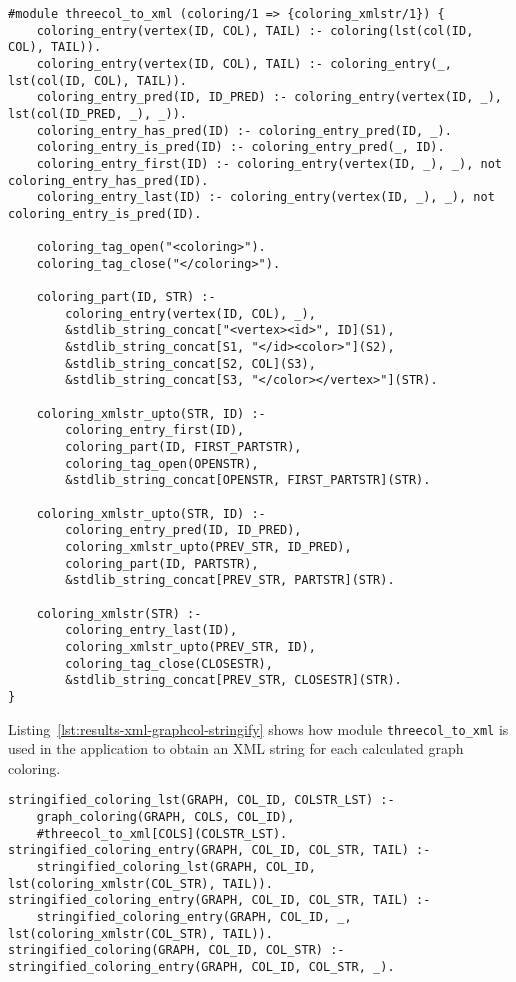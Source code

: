 \begin{lstlisting}[style=asp-code, label={lst:results-xml-graphcol-serialization}, caption={Generating XML strings for graph colorings.}]
#module threecol_to_xml (coloring/1 => {coloring_xmlstr/1}) {
    coloring_entry(vertex(ID, COL), TAIL) :- coloring(lst(col(ID, COL), TAIL)).
    coloring_entry(vertex(ID, COL), TAIL) :- coloring_entry(_, lst(col(ID, COL), TAIL)).
    coloring_entry_pred(ID, ID_PRED) :- coloring_entry(vertex(ID, _), lst(col(ID_PRED, _), _)).
    coloring_entry_has_pred(ID) :- coloring_entry_pred(ID, _).
    coloring_entry_is_pred(ID) :- coloring_entry_pred(_, ID).
    coloring_entry_first(ID) :- coloring_entry(vertex(ID, _), _), not coloring_entry_has_pred(ID).
    coloring_entry_last(ID) :- coloring_entry(vertex(ID, _), _), not coloring_entry_is_pred(ID).

    coloring_tag_open("<coloring>").
    coloring_tag_close("</coloring>").

    coloring_part(ID, STR) :- 
        coloring_entry(vertex(ID, COL), _), 
        &stdlib_string_concat["<vertex><id>", ID](S1),
        &stdlib_string_concat[S1, "</id><color>"](S2),
        &stdlib_string_concat[S2, COL](S3),
        &stdlib_string_concat[S3, "</color></vertex>"](STR).

    coloring_xmlstr_upto(STR, ID) :- 
        coloring_entry_first(ID), 
        coloring_part(ID, FIRST_PARTSTR),
        coloring_tag_open(OPENSTR),
        &stdlib_string_concat[OPENSTR, FIRST_PARTSTR](STR).

    coloring_xmlstr_upto(STR, ID) :- 
        coloring_entry_pred(ID, ID_PRED),
        coloring_xmlstr_upto(PREV_STR, ID_PRED),
        coloring_part(ID, PARTSTR),
        &stdlib_string_concat[PREV_STR, PARTSTR](STR).
        
    coloring_xmlstr(STR) :- 
        coloring_entry_last(ID),
        coloring_xmlstr_upto(PREV_STR, ID),
        coloring_tag_close(CLOSESTR),
        &stdlib_string_concat[PREV_STR, CLOSESTR](STR).	    
} 
\end{lstlisting}  

Listing~\ref{lst:results-xml-graphcol-stringify} shows how module \texttt{threecol\_to\_xml} is used in the application to obtain an XML string for each calculated graph coloring.

\begin{lstlisting}[style=asp-code, label={lst:results-xml-graphcol-stringify}, caption={Generating XML strings for graph colorings.}]
% Translate colorings into strings
stringified_coloring_lst(GRAPH, COL_ID, COLSTR_LST) :- 
    graph_coloring(GRAPH, COLS, COL_ID),
    #threecol_to_xml[COLS](COLSTR_LST).
stringified_coloring_entry(GRAPH, COL_ID, COL_STR, TAIL) :-
    stringified_coloring_lst(GRAPH, COL_ID, lst(coloring_xmlstr(COL_STR), TAIL)).
stringified_coloring_entry(GRAPH, COL_ID, COL_STR, TAIL) :-
    stringified_coloring_entry(GRAPH, COL_ID, _, lst(coloring_xmlstr(COL_STR), TAIL)).	
stringified_coloring(GRAPH, COL_ID, COL_STR) :- stringified_coloring_entry(GRAPH, COL_ID, COL_STR, _).
\end{lstlisting}  

